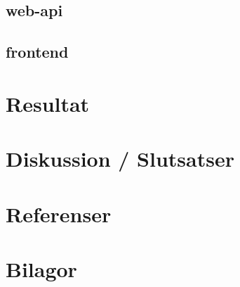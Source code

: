 \documentclass{article}
\begin{document}
\subsection{web-api}

\subsection{frontend}

\section{Resultat}

\section{Diskussion / Slutsatser}

\section{Referenser}

\section{Bilagor}
\end{document}

